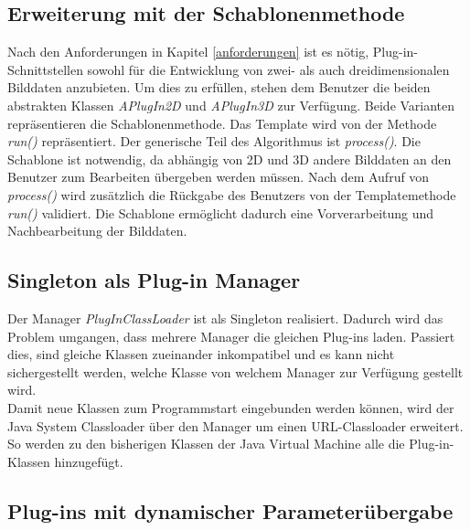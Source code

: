\subsection{Erweiterung mit der Schablonenmethode}
Nach den Anforderungen in Kapitel \ref{anforderungen} ist es nötig, Plug-in-Schnittstellen sowohl für die Entwicklung von zwei- als auch dreidimensionalen Bilddaten anzubieten. Um dies zu erfüllen, stehen dem Benutzer die beiden abstrakten Klassen \textit{APlugIn2D} und \textit{APlugIn3D} zur Verfügung. Beide Varianten repräsentieren die Schablonenmethode. Das Template wird von der Methode \textit{run()} repräsentiert. Der generische Teil des Algorithmus ist \textit{process()}. Die Schablone ist notwendig, da abhängig von 2D und 3D andere Bilddaten an den Benutzer zum Bearbeiten übergeben werden müssen. Nach dem Aufruf von \textit{process()} wird zusätzlich die Rückgabe des Benutzers von der Templatemethode \textit{run()} validiert. Die Schablone ermöglicht dadurch eine Vorverarbeitung und Nachbearbeitung der Bilddaten.
 
\subsection{Singleton als Plug-in Manager}
Der Manager \textit{PlugInClassLoader} ist als Singleton realisiert. Dadurch wird das Problem umgangen, dass mehrere Manager die gleichen Plug-ins laden. Passiert dies, sind gleiche Klassen zueinander inkompatibel und es kann nicht sichergestellt werden, welche Klasse von welchem Manager zur Verfügung gestellt wird.\\
Damit neue Klassen zum Programmstart eingebunden werden können, wird der Java System Classloader über den Manager um einen URL-Classloader erweitert. So werden zu den bisherigen Klassen der Java Virtual Machine alle die Plug-in-Klassen hinzugefügt.

\subsection{Plug-ins mit dynamischer Parameterübergabe} \label{genericdialog}

